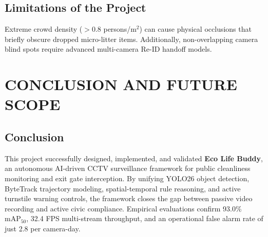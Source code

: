 \documentclass[12pt,a4paper]{report}
\begin{document}
\section{Limitations of the Project}
Extreme crowd density ($> 0.8$ persons/$\text{m}^2$) can cause physical occlusions that briefly obscure dropped micro-litter items. Additionally, non-overlapping camera blind spots require advanced multi-camera Re-ID handoff models.

\newpage
\chapter{CONCLUSION AND FUTURE SCOPE}

\section{Conclusion}
This project successfully designed, implemented, and validated \textbf{Eco Life Buddy}, an autonomous AI-driven CCTV surveillance framework for public cleanliness monitoring and exit gate interception. By unifying YOLO26 object detection, ByteTrack trajectory modeling, spatial-temporal rule reasoning, and active turnstile warning controls, the framework closes the gap between passive video recording and active civic compliance. Empirical evaluations confirm 93.0\% $\text{mAP}_{50}$, 32.4 FPS multi-stream throughput, and an operational false alarm rate of just 2.8 per camera-day.
\end{document}
